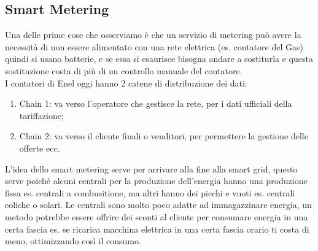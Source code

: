 \documentclass[11pt, twocolumn]{article}
\newenvironment{myenumerate}
{ \begin{enumerate}[topsep=0ex]
		\setlength{\itemsep}{0pt}
		\setlength{\parskip}{0pt}
		\setlength{\parsep}{0pt}     }
	{ \end{enumerate}                  }
\begin{document}
\subsection{Smart Metering}
Una delle prime cose che osserviamo è che un servizio di metering può avere la necessità di non essere alimentato con una rete elettrica (es. contatore del Gas) quindi si usano batterie, e se essa si esaurisce bisogna andare a sostiturla e questa sostituzione costa di più di un controllo manuale del contatore.\\
I contatori di Enel oggi hanno 2 catene di distribuzione dei dati:
\begin{myenumerate}
  \item Chain 1: va verso l'operatore che gestisce la rete, per i dati ufficiali della tariffazione;
  \item Chain 2: va verso il cliente finali o venditori, per permettere la gestione delle offerte ecc. 
\end{myenumerate}
L'idea dello smart metering serve per arrivare alla fine alla smart grid, questo serve poiché alcuni centrali per la produzione dell'energia hanno una produzione fissa es. centrali a combusitione, ma altri hanno dei picchi e vuoti es. centrali eoliche o solari.
Le centrali sono molto poco adatte ad immagazzinare energia, un metodo potrebbe essere offrire dei sconti al cliente per consumare energia in una certa fascia es. se ricarica macchina elettrica in una certa fascia orario ti costa di meno, ottimizzando così il consumo.
\end{document}
